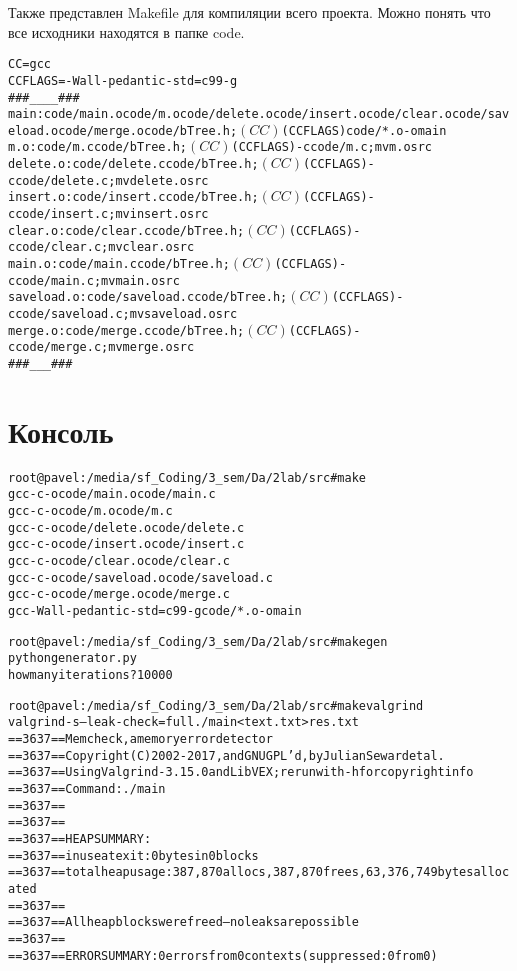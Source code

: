 Также представлен Makefile для компиляции всего проекта. Можно понять что все исходники находятся в папке code.

\begin{alltt}
CC = gcc
CCFLAGS = -Wall -pedantic -std=c99 -g
###____###
main		: code/main.o code/m.o code/delete.o code/insert.o code/clear.o code/saveload.o code/merge.o code/bTree.h ; $(CC) $(CCFLAGS) code/*.o -o main
m.o			: code/m.c code/bTree.h 		; $(CC) $(CCFLAGS) -c code/m.c 			; mv m.o src
delete.o	: code/delete.c code/bTree.h 	; $(CC) $(CCFLAGS) -c code/delete.c  	; mv delete.o src
insert.o	: code/insert.c code/bTree.h 	; $(CC) $(CCFLAGS) -c code/insert.c  	; mv insert.o src
clear.o 	: code/clear.c code/bTree.h		; $(CC) $(CCFLAGS) -c code/clear.c  	; mv clear.o src
main.o		: code/main.c code/bTree.h		; $(CC) $(CCFLAGS) -c code/main.c 		; mv main.o src
saveload.o	: code/saveload.c code/bTree.h	; $(CC) $(CCFLAGS) -c code/saveload.c 	; mv saveload.o src
merge.o		: code/merge.c code/bTree.h 	; $(CC) $(CCFLAGS) -c code/merge.c 		; mv merge.o src
###___###
\end{alltt}

\pagebreak

\section{Консоль}
\begin{alltt}
root@pavel:/media/sf_Coding/3_sem/Da/2lab/src# make
gcc    -c -o code/main.o code/main.c
gcc    -c -o code/m.o code/m.c
gcc    -c -o code/delete.o code/delete.c
gcc    -c -o code/insert.o code/insert.c
gcc    -c -o code/clear.o code/clear.c
gcc    -c -o code/saveload.o code/saveload.c
gcc    -c -o code/merge.o code/merge.c
gcc -Wall -pedantic -std=c99 -g code/*.o -o main

root@pavel:/media/sf_Coding/3_sem/Da/2lab/src# make gen
python generator.py
how many iterations?	10000

root@pavel:/media/sf_Coding/3_sem/Da/2lab/src# make valgrind
valgrind -s --leak-check=full ./main < text.txt > res.txt
==3637== Memcheck, a memory error detector
==3637== Copyright (C) 2002-2017, and GNU GPL'd, by Julian Seward et al.
==3637== Using Valgrind-3.15.0 and LibVEX; rerun with -h for copyright info
==3637== Command: ./main
==3637==
==3637==
==3637== HEAP SUMMARY:
==3637==     in use at exit: 0 bytes in 0 blocks
==3637==   total heap usage: 387,870 allocs, 387,870 frees, 63,376,749 bytes allocated
==3637==
==3637== All heap blocks were freed -- no leaks are possible
==3637==
==3637== ERROR SUMMARY: 0 errors from 0 contexts (suppressed: 0 from 0)
\end{alltt}

\pagebreak
